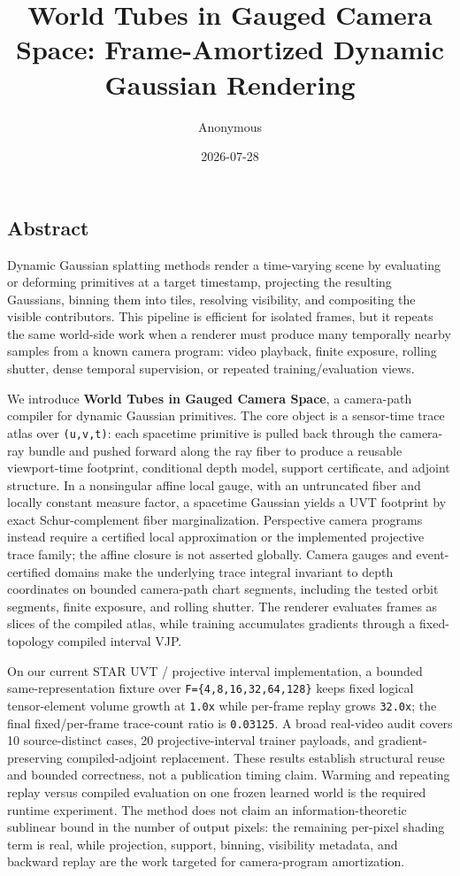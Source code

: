 \documentclass[
]{article}
\title{World Tubes in Gauged Camera Space: Frame-Amortized Dynamic
Gaussian Rendering}
\author{Anonymous}
\date{2026-07-28}
\begin{document}
\maketitle

\subsection{Abstract}\label{abstract}

Dynamic Gaussian splatting methods render a time-varying scene by
evaluating or deforming primitives at a target timestamp, projecting the
resulting Gaussians, binning them into tiles, resolving visibility, and
compositing the visible contributors. This pipeline is efficient for
isolated frames, but it repeats the same world-side work when a renderer
must produce many temporally nearby samples from a known camera program:
video playback, finite exposure, rolling shutter, dense temporal
supervision, or repeated training/evaluation views.

We introduce \textbf{World Tubes in Gauged Camera Space}, a camera-path
compiler for dynamic Gaussian primitives. The core object is a
sensor-time trace atlas over \texttt{(u,v,t)}: each spacetime primitive
is pulled back through the camera-ray bundle and pushed forward along
the ray fiber to produce a reusable viewport-time footprint, conditional
depth model, support certificate, and adjoint structure. In a
nonsingular affine local gauge, with an untruncated fiber and locally
constant measure factor, a spacetime Gaussian yields a UVT footprint by
exact Schur-complement fiber marginalization. Perspective camera
programs instead require a certified local approximation or the
implemented projective trace family; the affine closure is not asserted
globally. Camera gauges and event-certified domains make the underlying
trace integral invariant to depth coordinates on bounded camera-path
chart segments, including the tested orbit segments, finite exposure,
and rolling shutter. The renderer evaluates frames as slices of the
compiled atlas, while training accumulates gradients through a
fixed-topology compiled interval VJP.

On our current STAR UVT / projective interval implementation, a bounded
same-representation fixture over \texttt{F=\{4,8,16,32,64,128\}} keeps
fixed logical tensor-element volume growth at \texttt{1.0x} while
per-frame replay grows \texttt{32.0x}; the final fixed/per-frame
trace-count ratio is \texttt{0.03125}. A broad real-video audit covers
10 source-distinct cases, 20 projective-interval trainer payloads, and
gradient-preserving compiled-adjoint replacement. These results
establish structural reuse and bounded correctness, not a publication
timing claim. Warming and repeating replay versus compiled evaluation on
one frozen learned world is the required runtime experiment. The method
does not claim an information-theoretic sublinear bound in the number of
output pixels: the remaining per-pixel shading term is real, while
projection, support, binning, visibility metadata, and backward replay
are the work targeted for camera-program amortization.
\end{document}

